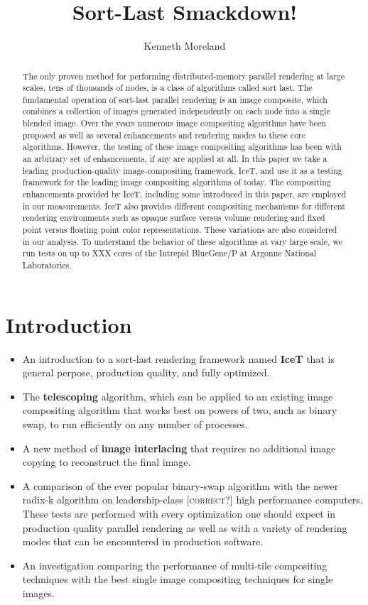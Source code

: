 \documentclass[letterpaper,twocolumn,10pt]{article}
\title{Sort-Last Smackdown!}
\author{Kenneth Moreland}
\newcommand*{\keyterm}[1]{\textbf{#1}}
\newcommand{\sticky}[1]{{\color{red}\textsc{[#1]}}}
\begin{document}
\maketitle

\begin{abstract}
  The only proven method for performing distributed-memory parallel
  rendering at large scales, tens of thousands of nodes, is a class of
  algorithms called sort last.  The fundamental operation of sort-last
  parallel rendering is an image composite, which combines a collection of
  images generated independently on each node into a single blended image.
  Over the years numerous image compositing algorithms have been proposed
  as well as several enhancements and rendering modes to these core
  algorithms.  However, the testing of these image compositing algorithms
  has been with an arbitrary set of enhancements, if any are applied at
  all.  In this paper we take a leading production-quality
  image-compositing framework, IceT, and use it as a testing framework for
  the leading image compositing algorithms of today.  The compositing
  enhancements provided by IceT, including some introduced in this paper,
  are employed in our measurements.  IceT also provides different
  compositing mechanisms for different rendering environments such as
  opaque surface versus volume rendering and fixed point versus floating
  point color representations.  These variations are also considered in our
  analysis.  To understand the behavior of these algorithms at vary large
  scale, we run tests on up to XXX cores of the Intrepid BlueGene/P at
  Argonne National Laboratories.
\end{abstract}

\section{Introduction}
\label{sec:Introduction}

\begin{itemize}
\item An introduction to a sort-last rendering framework named
  \keyterm{IceT} that is general perpose, production quality, and fully
  optimized.
\item The \keyterm{telescoping} algorithm, which can be applied to an
  existing image compositing algorithm that works best on powers of two,
  such as binary swap, to run efficiently on any number of processes.
\item A new method of \keyterm{image interlacing} that requires no
  additional image copying to reconstruct the final image.
\item A comparison of the ever popular binary-swap algorithm with the newer
  radix-k algorithm on leadership-class \sticky{correct?} high performance
  computers.  These tests are performed with every optimization one should
  expect in production quality parallel rendering as well as with a variety
  of rendering modes that can be encountered in production software.
\item An investigation comparing the performance of multi-tile compositing
  techniques \cite{2001 paper} with the best single image compositing
  techniques for single images.
\end{itemize}
\end{document}
